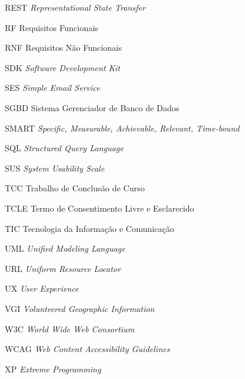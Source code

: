 \begin{siglas}
  \item[REST] \textit{Representational State Transfer}
  \item[RF] Requisitos Funcionais
  \item[RNF] Requisitos Não Funcionais
  \item[SDK] \textit{Software Development Kit}
  \item[SES] \textit{Simple Email Service}
  \item[SGBD] Sistema Gerenciador de Banco de Dados
  \item[SMART] \textit{Specific, Measurable, Achievable, Relevant, Time-bound}
  \item[SQL] \textit{Structured Query Language}
  \item[SUS] \textit{System Usability Scale}
  \item[TCC] Trabalho de Conclusão de Curso
  \item[TCLE] Termo de Consentimento Livre e Esclarecido
  \item[TIC] Tecnologia da Informação e Comunicação
  \item[UML] \textit{Unified Modeling Language}
  \item[URL] \textit{Uniform Resource Locator}
  \item[UX] \textit{User Experience}
  \item[VGI] \textit{Volunteered Geographic Information}
  \item[W3C] \textit{World Wide Web Consortium}
  \item[WCAG] \textit{Web Content Accessibility Guidelines}
  \item[XP] \textit{Extreme Programming}
\end{siglas}
